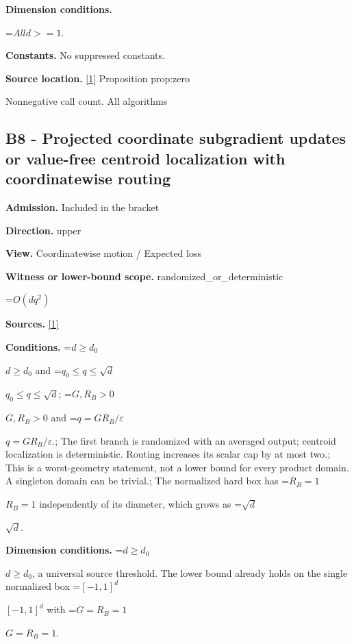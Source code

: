 \documentclass[10pt,a4paper]{article}
\newcommand{\AtlasMath}[1]{\par\begingroup\centering\setbox0=\hbox{$\displaystyle #1$}\ifdim\wd0>1.4\linewidth\typeout{ATLAS WIDE FORMULA: \the\wd0}\fi\ifdim\wd0>\linewidth\resizebox{\linewidth}{!}{\box0}\else\box0\fi\par\endgroup}
\newcommand{\AtlasInlineMath}[1]{\begingroup\setbox0=\hbox{$#1$}\ifdim\wd0>.4\linewidth\endgroup\AtlasMath{#1}\else\endgroup$#1$\fi}
\begin{document}
\textbf{Dimension conditions.}



\AtlasMath{All d>=1.}


\textbf{Constants.} No suppressed constants.



\textbf{Source location.} \href{https://github.com/WU-Wendao/Colombo/blob/main/colombo_sensorium/Complexity_altas/data/sources/colombo/U03/manuscript.pdf}{[1]} Proposition prop:zero



Nonnegative call count. All algorithms



\subsection{B8 - Projected coordinate subgradient updates or value-free centroid localization with coordinatewise routing}


\textbf{Admission.} Included in the bracket



\textbf{Direction.} upper



\textbf{View.} Coordinatewise motion / Expected loss



\textbf{Witness or lower-bound scope.} randomized\_or\_deterministic



\AtlasMath{O(dq^2)}


\textbf{Sources.} \href{https://github.com/WU-Wendao/Colombo/blob/main/colombo_sensorium/Complexity_altas/data/sources/colombo/U03/manuscript.pdf}{[1]}



\textbf{Conditions.} \AtlasInlineMath{d\ge d_0} and \AtlasInlineMath{q_0\le q\le\sqrt d}; \AtlasInlineMath{G,R_B>0} and \AtlasInlineMath{q=GR_B/\varepsilon}.; The first branch is randomized with an averaged output; centroid localization is deterministic. Routing increases its scalar cap by at most two.; This is a worst-geometry statement, not a lower bound for every product domain. A singleton domain can be trivial.; The normalized hard box has \AtlasInlineMath{R_B=1} independently of its diameter, which grows as \AtlasInlineMath{\sqrt d}.



\textbf{Dimension conditions.} \AtlasInlineMath{d\ge d_0}, a universal source threshold. The lower bound already holds on the single normalized box \AtlasInlineMath{[-1,1]^d} with \AtlasInlineMath{G=R_B=1}.
\end{document}
